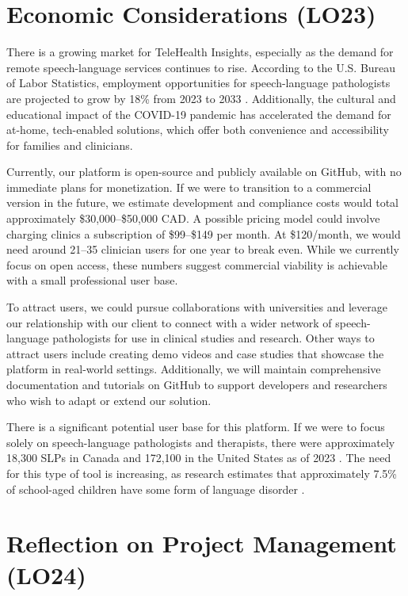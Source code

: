 \documentclass{article}
\begin{document}
\newpage

\section{Economic Considerations (LO23)}

\hspace{2em}There is a growing market for TeleHealth Insights, especially as the demand for remote speech-language services continues to rise. 
According to the U.S. Bureau of Labor Statistics, employment opportunities for speech-language pathologists are projected to grow by 18\% 
from 2023 to 2033 \cite{slpgrowth}. Additionally, the cultural and educational impact of the COVID-19 pandemic has accelerated the demand for 
at-home, tech-enabled solutions, which offer both convenience and accessibility for families and clinicians.

Currently, our platform is open-source and publicly available on GitHub, with no immediate plans for monetization. If we were to transition 
to a commercial version in the future, we estimate development and compliance costs would total approximately \$30,000–\$50,000 CAD. A 
possible pricing model could involve charging clinics a subscription of \$99–\$149 per month. At \$120/month, we would need around 21–35 
clinician users for one year to break even. While we currently focus on open access, these numbers suggest commercial viability is achievable 
with a small professional user base.

To attract users, we could pursue collaborations with universities and leverage our relationship with our client to connect with a wider network 
of speech-language pathologists for use in clinical studies and research. Other ways to attract users include creating demo videos and case studies that showcase 
the platform in real-world settings. Additionally, we will maintain comprehensive documentation and tutorials on GitHub to support developers 
and researchers who wish to adapt or extend our solution.

There is a significant potential user base for this platform. If we were to focus solely on speech-language pathologists and therapists, 
there were approximately 18,300 SLPs in Canada \cite{canadaslp} and 172,100 in the United States as of 2023 \cite{usslp}. The need for this type 
of tool is increasing, as research estimates that approximately 7.5\% of school-aged children have some form of language disorder \cite{childstats}. 

\section{Reflection on Project Management (LO24)}
\end{document}
